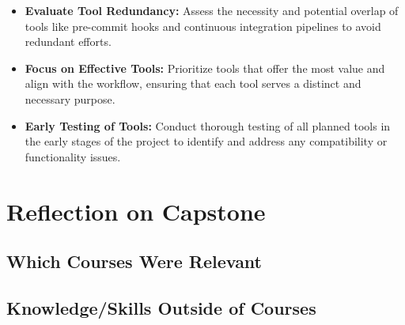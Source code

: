 \documentclass{article}
\begin{document}
\begin{itemize}
    \item \textbf{Evaluate Tool Redundancy:} Assess the necessity and potential
    overlap of tools like pre-commit hooks and continuous integration pipelines
    to avoid redundant efforts.
    \item \textbf{Focus on Effective Tools:} Prioritize tools that offer the
    most value and align with the workflow, ensuring that each tool serves a
    distinct and necessary purpose.
    \item \textbf{Early Testing of Tools:} Conduct thorough testing of all
    planned tools in the early stages of the project to identify and address any
    compatibility or functionality issues.
\end{itemize}

\section{Reflection on Capstone}


\subsection{Which Courses Were Relevant}


\subsection{Knowledge/Skills Outside of Courses}

\end{document}
